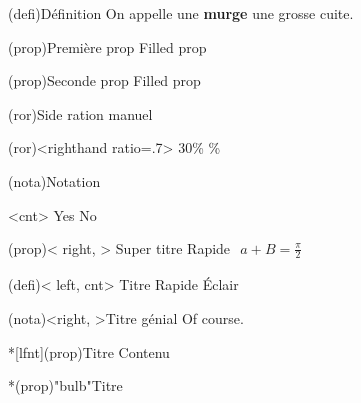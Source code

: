 \documentclass[a4paper, 10pt, garamond]{book}
\begin{document}
\begin{tcb}(defi){Définition}
	On appelle une \textbf{murge} une grosse cuite.
\end{tcb}

\begin{tcb*}[fil](prop){Première prop}
	Filled prop
\end{tcb*}

\begin{tcb}[fil](prop){Seconde prop}
	Filled prop
\end{tcb}

\begin{tcb}(ror){Side ration manuel}
	\lipsum[1]
	\smallbreak
	\begin{isd}(ror)<righthand ratio=.7>
		30\%
		\%
	\end{isd}
\end{tcb}

\begin{tcb*}(nota){Notation}
	\lipsum[1]
	\begin{isd}<cnt>
		Yes
		\tcblower
		No
	\end{isd}
	\lipsum[2]
\end{tcb*}

\sde(prop)< right, >
{Super titre}{
	Rapide
}{
	$
		\begin{gathered}
			a + B = \frac{\pi}{2}
		\end{gathered}
	$
}


\sde*(defi)< left, cnt>
{Titre}{
	Rapide
}{
	Éclair
}

\sde[lfnt](nota)<right, >{Titre génial}{
	\lipsum[2]
}{
	Of course.
}

\begin{tcb}*[lfnt](prop){Titre}
	Contenu
\end{tcb}

\begin{tcb}*(prop)"bulb"{Titre}

\end{tcb}
\end{document}
